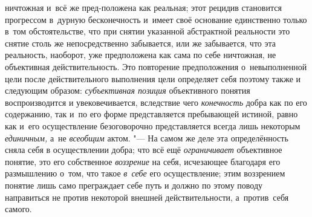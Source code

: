 ничтожная и~всё же пред-положена как реальная; этот рецидив становится
прогрессом в~дурную бесконечность и~имеет своё основание единственно только
в~том обстоятельстве, что при снятии указанной абстрактной реальности это
снятие столь же непосредственно забывается, или же забывается, что эта
реальность, наоборот, уже предположена как сама по себе ничтожная, не
объективная действительность. Это повторение предположения о~невыполненной
цели после действительного выполнения цели определяет себя поэтому также и
следующим образом: {\em субъективная
позиция} объективного понятия воспроизводится и
увековечивается, вследствие чего
{\em конечность} добра
как по его содержанию, так и~по его форме представляется
пребывающей истиной, равно как и~его осуществление безоговорочно
представляется всегда лишь некоторым
{\em единичным,} а~не
{\em всеобщим} актом. "---
На самом же деле эта определённость сняла себя в
осуществлении добра; что всё ещё
{\em ограничивает}
объективное понятие, это его собственное
{\em воззрение} на себя,
исчезающее благодаря его размышлению о~том, что такое
{\em в~себе} его
осуществление; этим воззрением понятие лишь само преграждает себе путь и
должно по этому поводу направиться не против некоторой внешней
действительности, а~против~себя самого.

